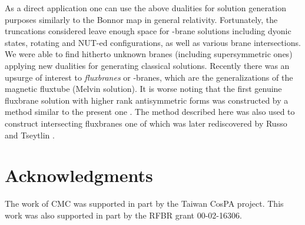 \documentclass[a4paper,12pt]{article}
\begin{document}
As a direct application one can use the above dualities  for
solution generation purposes similarly to the Bonnor map in
general relativity. Fortunately, the truncations considered
leave enough space for \coordHE{}-brane solutions including dyonic
states, rotating and NUT-ed configurations, as well as various
brane intersections. We were able to find hitherto unknown
branes (including supersymmetric ones) applying new dualities
for generating classical solutions. Recently there was an
upsurge of interest to  {\em fluxbranes} or \coordHE{}-branes, which
are the generalizations of the magnetic fluxtube (Melvin
solution). It is worse noting that the first genuine fluxbrane
solution with higher rank antisymmetric forms was constructed
by a method similar to the present one \cite{GaRy98}. The method
described here was also used to  construct  intersecting
fluxbranes  \cite{ChGaSh99}   one of which  was later
rediscovered  by Russo and Tseytlin \cite{RuTs01,Ts01}.


\section*{Acknowledgments}
The work of CMC was supported in part by the Taiwan CosPA
project. This work was also supported in part by the RFBR grant
00-02-16306.
\end{document}
